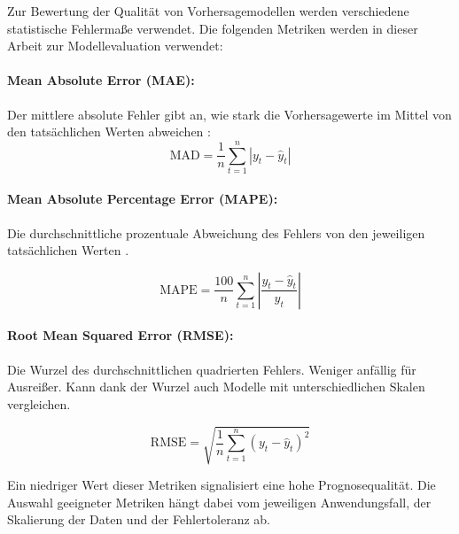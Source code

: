 Zur Bewertung der Qualität von Vorhersagemodellen werden verschiedene statistische Fehlermaße verwendet. Die folgenden Metriken werden in dieser Arbeit zur Modellevaluation verwendet:

\paragraph{Mean Absolute Error (MAE):}
Der mittlere absolute Fehler gibt an, wie stark die Vorhersagewerte im Mittel von den tatsächlichen Werten abweichen \cite{vanderlei2020}:
\begin{equation}
\text{MAD} = \frac{1}{n} \sum_{t=1}^{n} |y_t - \hat{y}_t|
\end{equation}

\paragraph{Mean Absolute Percentage Error (MAPE):}
Die durchschnittliche prozentuale Abweichung des Fehlers von den jeweiligen tatsächlichen Werten \cite{vanderlei2020}.

\begin{equation}
\text{MAPE} = \frac{100}{n} \sum_{t=1}^{n} \left| \frac{y_t - \hat{y}_t}{y_t} \right|
\end{equation}

\paragraph{Root Mean Squared Error (RMSE):}
Die Wurzel des durchschnittlichen quadrierten Fehlers. Weniger anfällig für Ausreißer. Kann dank der Wurzel auch Modelle mit unterschiedlichen Skalen vergleichen.

\begin{equation}
\text{RMSE} = \sqrt{ \frac{1}{n} \sum_{t=1}^{n} (y_t - \hat{y}_t)^2 }
\end{equation}

Ein niedriger Wert dieser Metriken signalisiert eine hohe Prognosequalität. Die Auswahl geeigneter Metriken hängt dabei vom jeweiligen Anwendungsfall, der Skalierung der Daten und der Fehlertoleranz ab.

